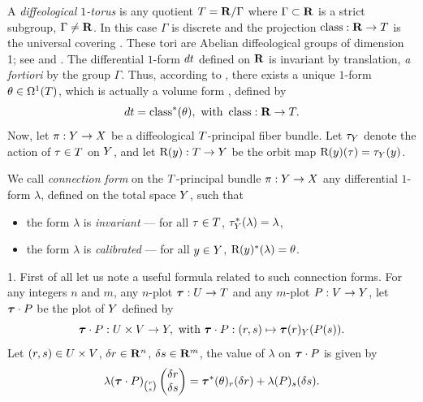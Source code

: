 \begin{article}
  \label{Connections-and-connection-1-forms-on-torus-bundles}
  A {\em diffeological $1$-torus} is any quotient $T = {\mathbf R}/\Gamma$ where $\Gamma \subset {\mathbf R}$ is a strict subgroup,
  $\Gamma \neq {\mathbf R}$.
  In this case $\Gamma$ is discrete and the projection $\operatorname{class} : {\mathbf R} \to T$ is the universal covering .
  These tori are Abelian diffeological groups of dimension 1;
  see  and .
  The differential $1$-form $\mathop{dt}\nolimits$ defined on ${\mathbf R}$ is invariant by translation,
  {\em a fortiori\/} by the group $\Gamma$.
  Thus,
  according to ,
  there exists a unique $1$-form $\theta \in \Omega^{1}(T)$,
  which is actually a volume form ,
  defined by
  $$%
  dt = \class^*(\theta), \text{ with } \class : \RR \to \Torus.
  $$%
  Now,
  let $\pi : Y \to X$ be a diffeological  $T$-principal fiber bundle.
  Let $\tau_Y$ denote the action of $\tau \in T$ on $Y$,
  and let $\mathrm{R}(y) : T \to Y$ be the orbit map $\mathrm{R}(y)(\tau) = \tau_Y(y)$.
  
  \Definition
  \begin{em} We call {\em connection form} on the $T$-principal bundle
  $\pi : Y \to X$ any differential $1$-form $\lambda$, defined on
  the total space $Y$, such that
  \begin{itemize}
    \item[(a)] the form $\lambda$ is {\em invariant} ---
    for all $\tau \in T$,
    $\tau_Y^*(\lambda) = \lambda$,
    \item[(b)] the form $\lambda$ is {\em calibrated} ---
    for all $y \in Y$, $\mathrm{R}(y)^*(\lambda) = \theta$.
  \end{itemize}
  \end{em}
  
  1. First of all let us note a useful formula related to such connection forms.
  For any integers $n$ and $m$, any $n$-plot $\boldsymbol \tau : U \to T$ and any $m$-plot $P : V \to Y$,
  let $\boldsymbol \tau \cdot P$ be the plot of $Y$ defined by
  $$%
  \btau \cdot \P : \U \times \V \to \Y, \text{ with } \btau \cdot \P : (r,s) \mapsto \btau(r)_\Y(\P(s)).
  $$%
  Let $(r,s) \in U \times V$,
  $\delta r \in {\mathbf R}^n$,
  $\delta s \in {\mathbf R}^m$,
  the value of $\lambda$ on $\boldsymbol \tau \cdot P$ is given by
  \begin{equation}
    \renewcommand{\theequation}{$\clubsuit$}
    \lambda(\btau \cdot \P)_{r \choose s} \vect{\delta r \\ \delta s} = \btau^*(\theta)_r(\delta r) + \lambda(\P)_s(\delta s).
  \end{equation}
  

\end{article}
